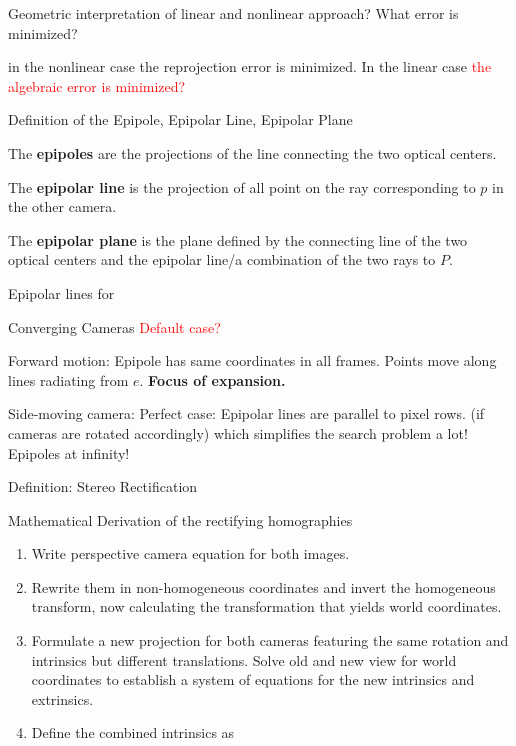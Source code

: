 \documentclass[10pt,a4paper]{scrartcl}
\begin{document}
\begin{multicols*}{2}
\begin{QandA}
{Geometric interpretation of linear and nonlinear approach? What error is minimized?}
\item in the nonlinear case the reprojection error is minimized. In the linear case \textcolor{red}{the algebraic error is minimized?}
\end{QandA}

\begin{QandA}
{Definition of the Epipole, Epipolar Line, Epipolar Plane}
\item The \textbf{epipoles} are the projections of the line connecting the two optical centers.
\item The \textbf{epipolar line} is the projection of all point on the ray corresponding to $p$ in the other camera.
\item The \textbf{epipolar plane} is the plane defined by the connecting line of the two optical centers and the epipolar line/a combination of the two rays to $P$.
\end{QandA}

\begin{QandA}
{Epipolar lines for}
\item Converging Cameras \textcolor{red}{Default case?}
\item Forward motion: Epipole has same coordinates in all frames. Points move along lines radiating from $e$. \textbf{Focus of expansion.}
\item Side-moving camera: Perfect case: Epipolar lines are parallel to pixel rows. (if cameras are rotated accordingly) which simplifies the search problem a lot! Epipoles at infinity!
\end{QandA}

\begin{QandA}
{Definition: Stereo Rectification}
\item Mathematical Derivation of the rectifying homographies
\begin{enumerate}
\item Write perspective camera equation for both images.
\item Rewrite them in non-homogeneous coordinates and invert the homogeneous transform, now calculating the transformation that yields world coordinates.
\item Formulate a new projection for both cameras featuring the same rotation and intrinsics but different translations. Solve old and new view for world coordinates to establish a system of equations for the new intrinsics and extrinsics.
\item Define the combined intrinsics as


\end{enumerate}
\end{QandA}
\end{multicols*}
\end{document}
